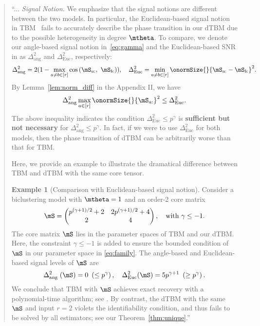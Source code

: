 \documentclass[11pt]{article}
\theoremstyle{definition}
\theoremstyle{definition}
\newtheorem{example}{Example}
\newcommand{\of}[1]{\left(#1\right)}
\begin{document}
\begin{enumerate}[wide, labelwidth=!, labelindent=0pt]
   \begin{quote}
   ``... \emph{Signal Notion.} We emphasize that the signal notions are different between the two models. In particular, the Euclidean-based signal notion in TBM~\cite{han2020exact} fails to accurately describe the phase transition in our dTBM due to the possible heterogeneity in degree $\mtheta$. To compare, we denote our angle-based signal notion in~\eqref{eq:gamma} and the Euclidean-based SNR in \cite{han2020exact} as $\Delta_{\text{ang}}^2$ and $\Delta_{\text{Euc}}^2$, respectively:
\begin{equation}
     \Delta_{\text{ang}}^2 =  2(1 - \max_{a \neq b\in [r]}\cos \of{\mS_{a:},\  \mS_{b:}} ), \quad \Delta_{\text{Euc}}^2 = \min_{a \neq b \in [r]} \onormSize{}{\mS_{a:} - \mS_{b:}}^2.
\end{equation}
By Lemma~\ref{lem:norm_diff} in the Appendix II, we have 
\begin{equation}\label{eq:signalcompare}
     \Delta_{\text{ang}}^2  \max_{a \in [r]}\onormSize{}{\mS_{a:}}^2 \leq \Delta_{\text{Euc}}^2.
\end{equation}
The above inequality indicates the condition $\Delta_{\text{Euc}}^2 \leq p^{\gamma}$ is {\bf sufficient but not necessary} for $\Delta_{\text{ang}}^2 \leq p^{\gamma}$. In fact, if we were to use $\Delta_{\text{Euc}}^2$ for both models, then the phase transition of dTBM can be arbitrarily worse than that for TBM. 


Here, we provide an example to illustrate the dramatical difference between TBM and dTBM with the same core tensor.  

\begin{example}[Comparison with Euclidean-based signal notion] \label{example:euc_alg} Consider a biclustering model with $\mtheta=1$ and an order-2 core matrix 
\begin{equation}
    \mS = \begin{pmatrix} p^{(\gamma+1)/2 } + 2  & 2 p^{(\gamma+1)/2} + 4\\
    2 & 4
    \end{pmatrix},\quad \text{with}\ \gamma \leq -1.
\end{equation}
The core matrix $\mS$ lies in the parameter spaces of TBM and our dTBM. Here, the constraint $\gamma \leq -1$ is added to ensure the bounded condition of $\mS$ in our parameter space in \eqref{eq:family}. The angle-based and Euclidean-based signal levels of $\mS$ are 
\begin{equation}
    \Delta_{\text{ang }}^2(\mS) = 0 \ \left(\leq p^{\gamma}\right), \quad \Delta_{\text{Euc}}^2(\mS) = 5 p^{\gamma + 1} \ \left(\geq p^{\gamma}\right).
\end{equation}
We conclude that TBM with $\mS$ achieves exact recovery with a polynomial-time algorithm; see \citet[Theorem 4]{han2020exact}. By contrast, the dTBM with the same $\mS$ and input $r=2$ violets the identifiability condition, and thus fails to be solved by all estimators; see our Theorem~\ref{thm:unique}.''
\end{example}


\end{quote}
\end{enumerate}
\end{document}
